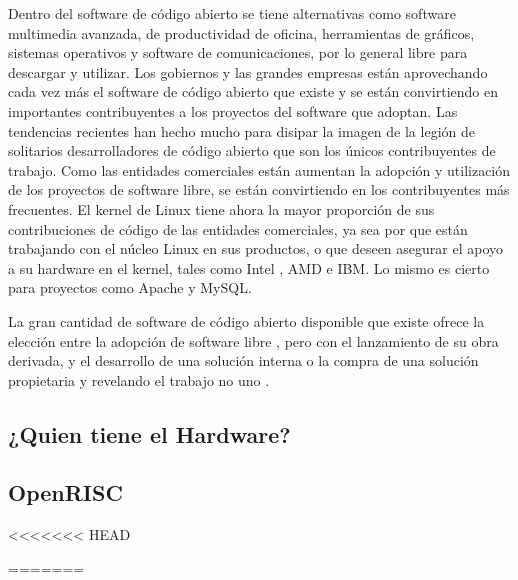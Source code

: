 Dentro del software de código abierto se tiene alternativas como software multimedia avanzada, de productividad de oficina,  herramientas de gráficos, sistemas operativos y software de comunicaciones, por lo general libre para descargar y utilizar. Los gobiernos y las grandes empresas están aprovechando cada vez más el software de código abierto que existe y se están convirtiendo en importantes contribuyentes a los proyectos del software que adoptan. Las tendencias recientes han hecho mucho para disipar la imagen de la legión de solitarios desarrolladores de código abierto que son los únicos contribuyentes de trabajo. 
Como las entidades comerciales están aumentan la adopción y utilización de los proyectos de software libre,  se están convirtiendo en los contribuyentes más frecuentes. El kernel de Linux tiene ahora la mayor proporción de sus contribuciones de código de las entidades comerciales, ya sea por que están trabajando con el núcleo Linux en sus productos, o que deseen asegurar el apoyo a su hardware en el kernel, tales como Intel , AMD e IBM. Lo mismo es cierto para proyectos como Apache y MySQL.

La gran cantidad de software de código abierto disponible que existe ofrece la elección entre la adopción de software libre , pero con el lanzamiento de su obra derivada, y el desarrollo de una solución interna o la compra de una solución propietaria y revelando el trabajo no uno .		



		\subsection{¿Quien tiene el Hardware?}

		\subsection{OpenRISC}




\begin{figure}[h!]
 \begin{center}
  \label{fig:esquema}
 \end{center}
\end{figure}

<<<<<<< HEAD


=======

